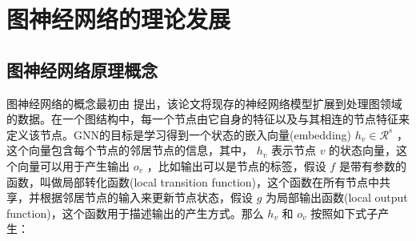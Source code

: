 \documentclass[a4paper,UTF8]{article}
\numberwithin{equation}{section}
\begin{document}
	
	\section{图神经网络的理论发展}
	
	\subsection{图神经网络原理概念}
	
	图神经网络的概念最初由\citep{journal/FScarselli2009} 提出，该论文将现存的神经网络模型扩展到处理图领域的数据。在一个图结构中，每一个节点由它自身的特征以及与其相连的节点特征来定义该节点。GNN的目标是学习得到一个状态的嵌入向量(embedding) $h_v \in \mathcal{R}^s$ ，这个向量包含每个节点的邻居节点的信息，其中， $h_v$ 表示节点 $v$ 的状态向量，这个向量可以用于产生输出 $o_v$ ，比如输出可以是节点的标签，假设 $f$ 是带有参数的函数，叫做局部转化函数(local transition function)，这个函数在所有节点中共享，并根据邻居节点的输入来更新节点状态，假设 $g$ 为局部输出函数(local output function)，这个函数用于描述输出的产生方式。那么 $h_v$ 和 $o_v$ 按照如下式子产生：
	
\end{document}
